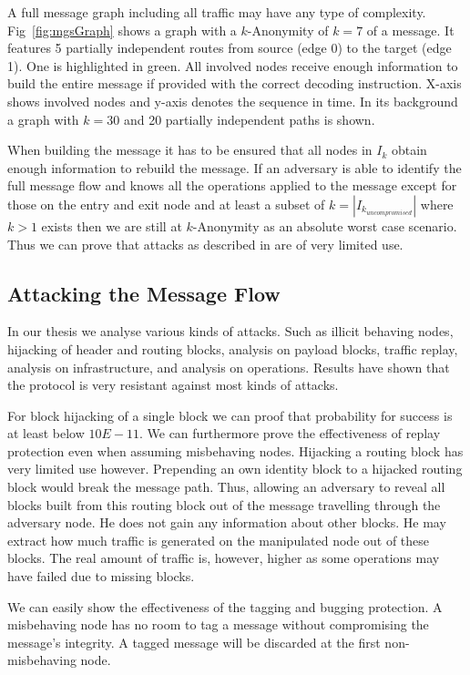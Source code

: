 \documentclass[9pt,journal,compsoc]{IEEEtran}
\begin{document}
A full message graph including all traffic may have any type of complexity. Fig~\ref{fig:mgsGraph} shows a graph with a $k$-Anonymity of $k=7$ of a message. It features 5 partially independent routes from source (edge 0) to the target (edge 1). One is highlighted in green. All involved nodes receive enough information to build the entire message if provided with the correct decoding instruction. X-axis shows involved nodes and y-axis denotes the sequence in time. In its background a graph with $k=30$ and 20 partially independent paths is shown.

When building the message it has to be ensured that all nodes in $I_k$ obtain enough information to rebuild the message. If an adversary is able to identify the full message flow and knows all the operations applied to the message except for those on the entry and exit node and at least a subset of $k=|I_{k_{uncompromised}}|$ where $k>1$ exists then we are still at $k$-Anonymity as an absolute worst case scenario. Thus we can prove that attacks as described in \cite{DanSer04} are of very limited use. 

\subsection{Attacking the Message Flow}
In our thesis\cite{messageVortex} we analyse various kinds of attacks. Such as illicit behaving nodes, hijacking of header and routing blocks, analysis on payload blocks, traffic replay, analysis on infrastructure, and analysis on operations. Results have shown that the protocol is very resistant against most kinds of attacks.

For block hijacking of a single block we can proof that probability for success is at least below $10E-11$. We can furthermore prove the effectiveness of replay protection even when assuming misbehaving nodes. Hijacking a routing block has very limited use however. Prepending an own identity block to a hijacked routing block would break the message path. Thus, allowing an adversary to reveal all blocks built from this routing block out of the message travelling through the adversary node. He does not gain any information about other blocks. He may extract how much traffic is generated on the manipulated node out of these blocks. The real amount of traffic is, however, higher as some operations may have failed due to missing blocks.

We can easily show the effectiveness of the tagging and bugging protection. A misbehaving node has no room to tag a message without compromising the message's integrity. A tagged message will be discarded at the first non-misbehaving node.
\end{document}
